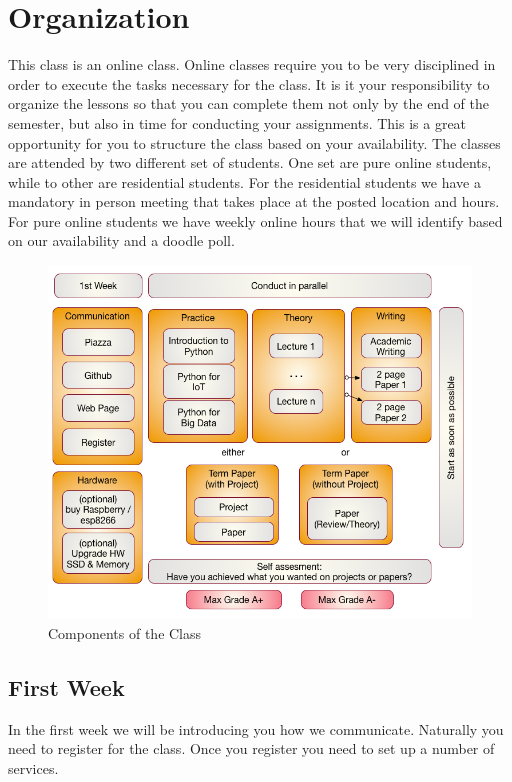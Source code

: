 \FILENAME

\section{Organization}

This class is an online class. Online classes require you to be very
disciplined in order to execute the tasks necessary for the class. It is
it your responsibility to organize the lessons so that you can complete
them not only by the end of the semester, but also in time for
conducting your assignments. This is a great opportunity for you to
structure the class based on your availability. The classes are attended
by two different set of students. One set are pure online students,
while to other are residential students. For the residential students we
have a mandatory in person meeting that takes place at the posted
location and hours. For pure online students we have weekly online hours
that we will identify based on our availability and a doodle poll.

\begin{figure}
\centering
\includegraphics[width=\textwidth]{images/i523-overview.png}
\caption{Components of the Class}
\end{figure}


\subsection{First Week}

In the first week we will be introducing you how we communicate.
Naturally you need to register for the class. Once you register you need
to set up a number of services.

